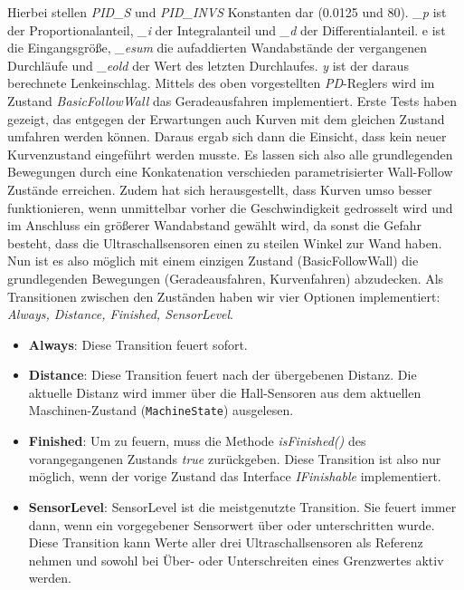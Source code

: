 Hierbei stellen \textit{PID\_S} und \textit{PID\_INVS} Konstanten dar (0.0125 und 80). \textit{\_p} ist der Proportionalanteil, \textit{\_i} der Integralanteil und \textit{\_d} der Differentialanteil. e ist die Eingangsgröße, \textit{\_esum} die aufaddierten Wandabstände der vergangenen Durchläufe und \textit{\_eold} der Wert des letzten Durchlaufes. \textit{y} ist der daraus berechnete Lenkeinschlag.
\newline
\newline
Mittels des oben vorgestellten \textit{PD}-Reglers wird im Zustand \textit{BasicFollowWall} das Geradeausfahren implementiert. Erste Tests haben gezeigt, das entgegen der Erwartungen auch Kurven mit dem gleichen Zustand umfahren werden können. Daraus ergab sich dann die Einsicht, dass kein neuer Kurvenzustand eingeführt werden musste. Es lassen sich also alle grundlegenden Bewegungen durch eine Konkatenation verschieden parametrisierter Wall-Follow Zustände erreichen. Zudem hat sich herausgestellt, dass Kurven umso besser funktionieren, wenn unmittelbar vorher die Geschwindigkeit gedrosselt wird und im Anschluss ein größerer Wandabstand gewählt wird, da sonst die Gefahr besteht, dass die Ultraschallsensoren einen zu steilen Winkel zur Wand haben. 
Nun ist es also möglich mit einem einzigen Zustand (BasicFollowWall) die grundlegenden Bewegungen (Geradeausfahren, Kurvenfahren) abzudecken. Als Transitionen zwischen den Zuständen haben wir vier Optionen implementiert: \textit{Always, Distance, Finished, SensorLevel}. 
\begin{itemize}
	\item \textbf{Always}: Diese Transition feuert sofort.
	\item \textbf{Distance}: Diese Transition feuert nach der übergebenen Distanz. Die aktuelle Distanz wird immer über die Hall-Sensoren aus dem aktuellen Maschinen-Zustand (\texttt{MachineState}) ausgelesen. 
	\item \textbf{Finished}: Um zu feuern, muss die Methode \textit{isFinished()} des vorangegangenen Zustands \textit{true} zurückgeben. Diese Transition ist also nur möglich, wenn der vorige Zustand das Interface \textit{IFinishable} implementiert. 
	\item \textbf{SensorLevel}:	SensorLevel ist die meistgenutzte Transition. Sie feuert immer dann, wenn ein vorgegebener Sensorwert über oder unterschritten wurde. Diese Transition kann Werte aller drei Ultraschallsensoren als Referenz nehmen und sowohl bei Über- oder Unterschreiten eines Grenzwertes aktiv werden. 
\end{itemize}
